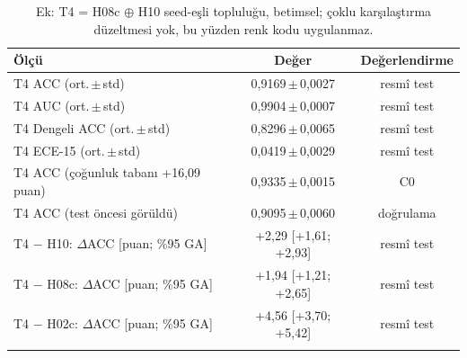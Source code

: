 \begin{table}[!htbp]
\centering\small
\setlength{\tabcolsep}{4pt}
\caption{Ek: T4 = H08c $\oplus$ H10 seed-eşli topluluğu, betimsel; çoklu karşılaştırma düzeltmesi yok, bu yüzden renk kodu uygulanmaz.}\label{tab:t4}
\begin{tabularx}{\textwidth}{>{\raggedright\arraybackslash}X cc}
\toprule
Ölçü & Değer & Değerlendirme \\
\midrule
T4 ACC (ort.\,$\pm$\,std) & 0,9169\,$\pm$\,0,0027 & resmî test \\
T4 AUC (ort.\,$\pm$\,std) & 0,9904\,$\pm$\,0,0007 & resmî test \\
T4 Dengeli ACC (ort.\,$\pm$\,std) & 0,8296\,$\pm$\,0,0065 & resmî test \\
T4 ECE-15 (ort.\,$\pm$\,std) & 0,0419\,$\pm$\,0,0029 & resmî test \\
T4 ACC (çoğunluk tabanı +16,09 puan) & 0,9335\,$\pm$\,0,0015 & C0 \\
T4 ACC (test öncesi görüldü) & 0,9095\,$\pm$\,0,0060 & doğrulama \\
\midrule
T4 $-$ H10: $\Delta$ACC [puan; \%95 GA] & +2,29 [+1,61; +2,93] & resmî test \\
T4 $-$ H08c: $\Delta$ACC [puan; \%95 GA] & +1,94 [+1,21; +2,65] & resmî test \\
T4 $-$ H02c: $\Delta$ACC [puan; \%95 GA] & +4,56 [+3,70; +5,42] & resmî test \\
\botrule
\end{tabularx}
\end{table}
